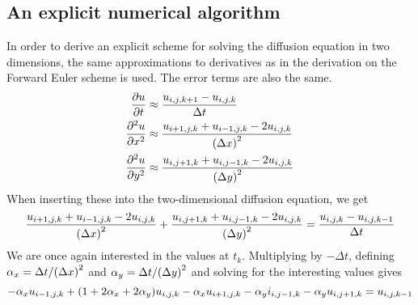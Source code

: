 \subsection{An explicit numerical algorithm}
In order to derive an explicit scheme for solving the diffusion equation in two dimensions, the same approximations to derivatives as in the derivation on the Forward Euler scheme is used. The error terms are also the same.
\begin{alignat*}{2}
    \pdv{u}{t} &\approx \frac{u_{i,j,k+1} - u_{i,j,k}}{\Delta t}\\
    \pdv[2]{u}{x} &\approx \frac{u_{i+1,j,k} + u_{i-1,j,k} - 2u_{i,j,k}}{\qty(\Delta x)^2}\\
    \pdv[2]{u}{y} &\approx \frac{u_{i,j+1,k} + u_{i,j-1,k} - 2u_{i,j,k}}{\qty(\Delta y)^2}
\end{alignat*}
When inserting these into the two-dimensional diffusion equation, we get
\[
    \frac{u_{i+1,j,k} + u_{i-1,j,k} - 2u_{i,j,k}}{\qty(\Delta x)^2} +
    \frac{u_{i,j+1,k} + u_{i,j-1,k} - 2u_{i,j,k}}{\qty(\Delta y)^2} =
    \frac{u_{i,j,k} - u_{i,j,k-1}}{\Delta t}
\]
We are once again interested in the values at \(t_k\). Multiplying by \(-\Delta t\), defining \(\alpha_x=\Delta t/\qty(\Delta x)^2\) and \(\alpha_y=\Delta t/\qty(\Delta y)^2\) and solving for the interesting values gives
\[
    -\alpha_x u_{i-1,j,k} + \qty(1+2\alpha_x+2\alpha_y)u_{i,j,k} - \alpha_x u_{i+1,j,k} - \alpha_y i_{i,j-1,k} - \alpha_y u_{i,j+1,k} = u_{i,j,k-1}
\]
